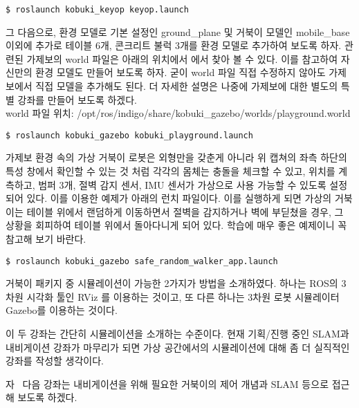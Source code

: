 \vspace{\baselineskip}
\begin{lstlisting}[language=ROS]
$ roslaunch kobuki_keyop keyop.launch
\end{lstlisting}

그 다음으로,  환경 모델로 기본 설정인 ground\_plane 및 거북이 모델인 mobile\_base 이외에 추가로 테이블 6개, 콘크리트 불럭 3개를 환경 모델로 추가하여 보도록 하자. 관련된 가제보의 world 파일은 아래의 위치에서 에서 찾아 볼 수 있다.  이를 참고하여 자신만의 환경 모델도 만들어 보도록 하자. 굳이 world 파일 직접 수정하지 않아도 가제보에서 직접 모델을 추가해도 된다. 더 자세한 설명은 나중에 가제보에 대한 별도의 특별 강좌를 만들어 보도록 하겠다.\\
world 파일 위치: /opt/ros/indigo/share/kobuki\_gazebo/worlds/playground.world

\vspace{\baselineskip}
\begin{lstlisting}[language=ROS]
$ roslaunch kobuki_gazebo kobuki_playground.launch
\end{lstlisting}

가제보 환경 속의 가상 거북이 로봇은 외형만을 갖춘게 아니라 위 캡쳐의 좌측 하단의 특성 창에서 확인할 수 있는 것 처럼 각각의 몸체는 충돌을 체크할 수 있고, 위치를 계측하고, 범퍼 3개, 절벽 감지 센서, IMU 센서가 가상으로 사용 가능할 수 있도록 설정되어 있다. 이를 이용한 예제가 아래의 런치 파일이다. 이를 실행하게 되면 가상의 거북이는 테이블 위에서 랜덤하게 이동하면서 절벽을 감지하거나 벽에 부딛쳤을 경우, 그 상황을 회피하여 테이블 위에서 돌아다니게 되어 있다. 학습에 매우 좋은 예제이니 꼭 참고해 보기 바란다.

\vspace{\baselineskip}
\begin{lstlisting}[language=ROS]
$ roslaunch kobuki_gazebo safe_random_walker_app.launch
\end{lstlisting}

거북이 패키지 중 시뮬레이션이 가능한 2가지가 방법을 소개하였다. 하나는 ROS의 3차원 시각화 툴인 RViz 를 이용하는 것이고, 또 다른 하나는 3차원 로봇 시뮬레이터 Gazebo를 이용하는 것이다. 

이 두 강좌는 간단히 시뮬레이션을 소개하는 수준이다. 현재 기획/진행 중인 SLAM과 내비게이션 강좌가 마무리가 되면 가상 공간에서의 시뮬레이션에 대해 좀 더 실직적인 강좌를 작성할 생각이다. 

자~ 다음 강좌는 내비게이션을 위해 필요한 거북이의 제어 개념과 SLAM 등으로 접근해 보도록 하겠다.

